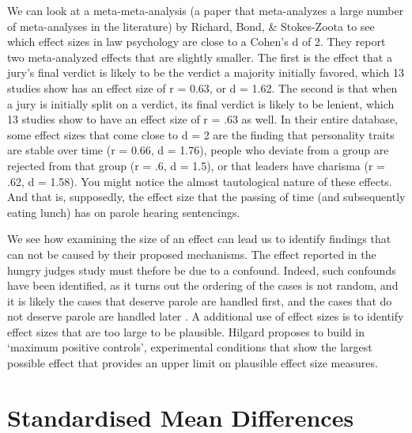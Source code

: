 \documentclass[
]{krantz}
\begin{document}
We can look at a meta-meta-analysis (a paper that meta-analyzes a large number of meta-analyses in the literature) by Richard, Bond, \& Stokes-Zoota \citeyearpar{richard_one_2003} to see which effect sizes in law psychology are close to a Cohen's d of 2. They report two meta-analyzed effects that are slightly smaller. The first is the effect that a jury's final verdict is likely to be the verdict a majority initially favored, which 13 studies show has an effect size of r = 0.63, or d = 1.62. The second is that when a jury is initially split on a verdict, its final verdict is likely to be lenient, which 13 studies show to have an effect size of r = .63 as well. In their entire database, some effect sizes that come close to d = 2 are the finding that personality traits are stable over time (r = 0.66, d = 1.76), people who deviate from a group are rejected from that group (r = .6, d = 1.5), or that leaders have charisma (r = .62, d = 1.58). You might notice the almost tautological nature of these effects. And that is, supposedly, the effect size that the passing of time (and subsequently eating lunch) has on parole hearing sentencings.

We see how examining the size of an effect can lead us to identify findings that can not be caused by their proposed mechanisms. The effect reported in the hungry judges study must thefore be due to a confound. Indeed, such confounds have been identified, as it turns out the ordering of the cases is not random, and it is likely the cases that deserve parole are handled first, and the cases that do not deserve parole are handled later \citep{weinshall-margel_overlooked_2011, chatziathanasiou_beware_2022}. A additional use of effect sizes is to identify effect sizes that are too large to be plausible. Hilgard \citeyearpar{hilgard_maximal_2021} proposes to build in `maximum positive controls', experimental conditions that show the largest possible effect that provides an upper limit on plausible effect size measures.

\hypertarget{cohend}{%
\section{Standardised Mean Differences}\label{cohend}}
\end{document}
